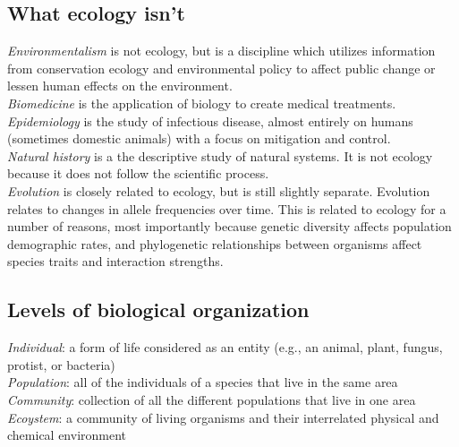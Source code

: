 \documentclass[12pt]{article}
\begin{document}
\subsection*{What ecology isn't}

\textit{Environmentalism} is not ecology, but is a discipline which utilizes information from conservation ecology and environmental policy to affect public change or lessen human effects on the environment. \\


\textit{Biomedicine} is the application of biology to create medical treatments. \\


\textit{Epidemiology} is the study of infectious disease, almost entirely on humans (sometimes domestic animals) with a focus on mitigation and control. \\


\textit{Natural history} is a the descriptive study of natural systems. It is not ecology because it does not follow the scientific process. \\


\textit{Evolution} is closely related to ecology, but is still slightly separate. Evolution relates to changes in allele frequencies over time. This is related to ecology for a number of reasons, most importantly because genetic diversity affects population demographic rates, and phylogenetic relationships between organisms affect species traits and interaction strengths. 










\subsection*{Levels of biological organization}


\textit{Individual}: a form of life considered as an entity (e.g., an animal, plant, fungus, protist, or bacteria) \\


\textit{Population}: all of the individuals of a species that live in the same area \\


\textit{Community}: collection of all the different populations that live in one area \\


\textit{Ecoystem}: a community of living organisms and their interrelated physical and chemical environment \\
\end{document}
